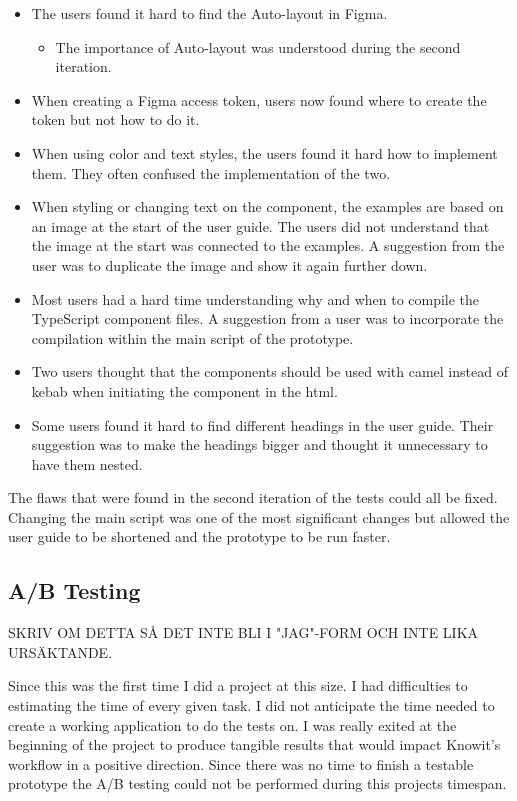 \begin{itemize}
   \item The users found it hard to find the Auto-layout in Figma.
      \begin{itemize}
         \item The importance of Auto-layout was understood during the second iteration.
      \end{itemize}
   \item When creating a Figma access token, users now found where to create the token but not how to do it.
   \item When using color and text styles, the users found it hard how to implement them. They often confused the implementation of the two. 
   \item When styling or changing text on the component, the examples are based on an image at the start of the user guide. The users did not understand that the image at the start was connected to the examples. A suggestion from the user was to duplicate the image and show it again further down.
   \item Most users had a hard time understanding why and when to compile the TypeScript component files. A suggestion from a user was to incorporate the compilation within the main script of the prototype.
   \item Two users thought that the components should be used with \gls{camel} instead of \gls{kebab} when initiating the component in the \acrshort{html}.
   \item Some users found it hard to find different headings in the user guide. Their suggestion was to make the headings bigger and thought it unnecessary to have them nested.
\end{itemize}

The flaws that were found in the second iteration of the tests could all be fixed. Changing the main script was one of the most significant changes but allowed the user guide to be shortened and the prototype to be run faster.


\subsection{A/B Testing}%
\label{sub:A/B Testing}

SKRIV OM DETTA SÅ DET INTE BLI I "JAG"-FORM OCH INTE LIKA URSÄKTANDE.

Since this was the first time I did a project at this size. I had difficulties to estimating the time of every given task. I did not anticipate the time needed to create a working application to do the tests on. I was really exited at the beginning of the project to produce tangible results that would impact Knowit's workflow in a positive direction. Since there was no time to finish a testable prototype the A/B testing could not be performed during this projects timespan.
